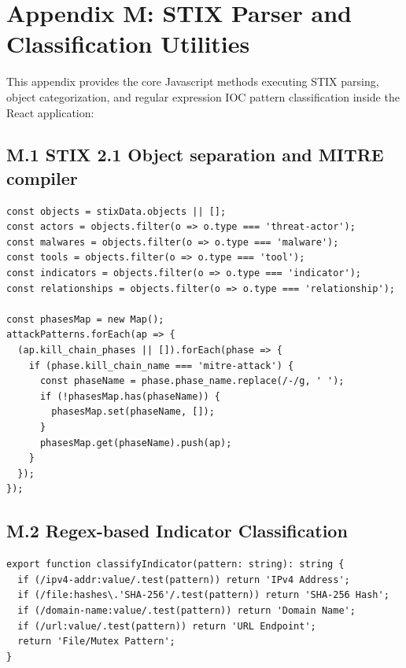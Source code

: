 \section*{Appendix M: STIX Parser and Classification Utilities}
This appendix provides the core Javascript methods executing STIX parsing, object categorization, and regular expression IOC pattern classification inside the React application:

\subsection*{M.1 STIX 2.1 Object separation and MITRE compiler}
\begin{verbatim}
const objects = stixData.objects || [];
const actors = objects.filter(o => o.type === 'threat-actor');
const malwares = objects.filter(o => o.type === 'malware');
const tools = objects.filter(o => o.type === 'tool');
const indicators = objects.filter(o => o.type === 'indicator');
const relationships = objects.filter(o => o.type === 'relationship');

const phasesMap = new Map();
attackPatterns.forEach(ap => {
  (ap.kill_chain_phases || []).forEach(phase => {
    if (phase.kill_chain_name === 'mitre-attack') {
      const phaseName = phase.phase_name.replace(/-/g, ' ');
      if (!phasesMap.has(phaseName)) {
        phasesMap.set(phaseName, []);
      }
      phasesMap.get(phaseName).push(ap);
    }
  });
});
\end{verbatim}

\subsection*{M.2 Regex-based Indicator Classification}
\begin{verbatim}
export function classifyIndicator(pattern: string): string {
  if (/ipv4-addr:value/.test(pattern)) return 'IPv4 Address';
  if (/file:hashes\.'SHA-256'/.test(pattern)) return 'SHA-256 Hash';
  if (/domain-name:value/.test(pattern)) return 'Domain Name';
  if (/url:value/.test(pattern)) return 'URL Endpoint';
  return 'File/Mutex Pattern';
}
\end{verbatim}



